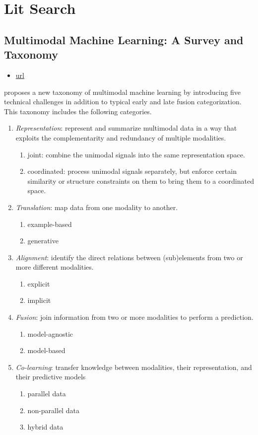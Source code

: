 \section{Lit Search}
\subsection{Multimodal Machine Learning: A Survey and Taxonomy}

\begin{itemize}
\item \href{https://ieeexplore.ieee.org/document/8269806}{url}
\end{itemize}

\citet{baltrusaitisMultimodalMachineLearning2019} proposes a new taxonomy of multimodal machine learning by introducing five technical challenges in addition to typical early and late fusion categorization. This taxonomy includes the following categories.
\begin{enumerate}
\item \textit{Representation}: represent and summarize multimodal data in a way that exploits the complementarity and redundancy of multiple modalities.
\begin{enumerate}
\item joint: combine the unimodal signals into the same representation space.
\item coordinated: process unimodal signals separately, but enforce certain similarity or structure constraints on them to bring them to a coordinated space.
\end{enumerate}
\item \textit{Translation}: map data from one modality to another.
\begin{enumerate}
\item example-based
\item generative
\end{enumerate}
\item \textit{Alignment}: identify the direct relations between (sub)elements from two or more different modalities.
\begin{enumerate}
\item explicit
\item implicit
\end{enumerate}
\item \textit{Fusion}: join information from two or more modalities to perform a prediction.
\begin{enumerate}
\item model-agnostic
\item model-based
\end{enumerate}
\item \textit{Co-learning}: transfer knowledge between modalities, their representation, and their predictive models
\begin{enumerate}
\item parallel data
\item non-parallel data
\item hybrid data
\end{enumerate}
\end{enumerate}

